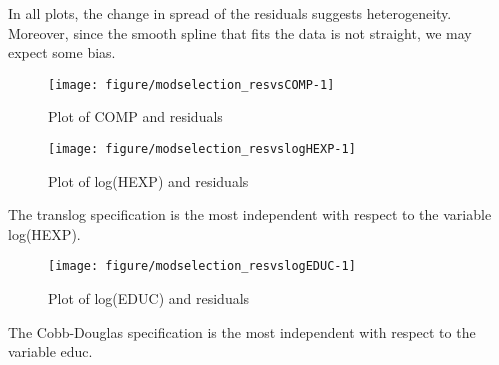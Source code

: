 \documentclass[12pt,a4paper]{article}\usepackage[]{graphicx}\usepackage[]{color}
\newenvironment{knitrout}{}{} %
\begin{document}
In all plots, the change in spread of the residuals suggests heterogeneity. Moreover, since the smooth spline that fits the data is not straight, we may expect some bias.


\begin{knitrout}
\color{fgcolor}\begin{figure}[htbp]

{\centering \texttt{[image: figure/modselection\_resvsCOMP-1]} 

}

\caption[Plot of COMP and residuals]{Plot of COMP and residuals}\label{fig:modselection_resvsCOMP}
\end{figure}


\end{knitrout}



\begin{knitrout}
\color{fgcolor}\begin{figure}[htbp]

{\centering \texttt{[image: figure/modselection\_resvslogHEXP-1]} 

}

\caption[Plot of log(HEXP) and residuals]{Plot of log(HEXP) and residuals}\label{fig:modselection_resvslogHEXP}
\end{figure}


\end{knitrout}

The translog specification is the most independent with respect to the variable log(HEXP).


\begin{knitrout}
\color{fgcolor}\begin{figure}[htbp]

{\centering \texttt{[image: figure/modselection\_resvslogEDUC-1]} 

}

\caption[Plot of log(EDUC) and residuals]{Plot of log(EDUC) and residuals}\label{fig:modselection_resvslogEDUC}
\end{figure}


\end{knitrout}

The Cobb-Douglas specification is the most independent with respect to the variable educ.
\end{document}
